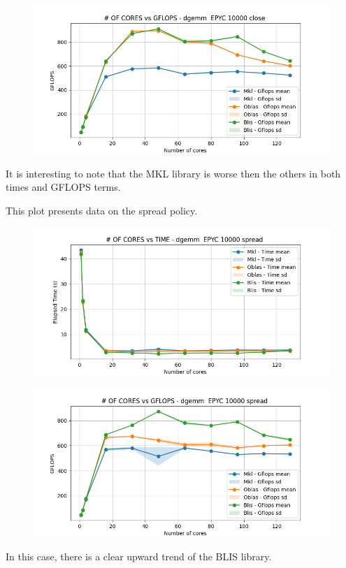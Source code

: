 \documentclass{article}
\begin{document}
\begin{figure}[H]
    \centering
    \includegraphics[width=\textwidth]{EPYC scalability/dgemm__EPYC_10000_close_gflops.png}
\end{figure}

It is interesting to note that the MKL library is worse then the others in both times and GFLOPS terms.

This plot presents data on the spread policy.
\begin{figure}[H]
    \centering
    \includegraphics[width=\textwidth]{EPYC scalability/dgemm__EPYC_10000_spread_time.png}
\end{figure}

\begin{figure}[H]
    \centering
    \includegraphics[width=\textwidth]{EPYC scalability/dgemm__EPYC_10000_spread_gflops.png}
\end{figure}
In this case, there is a clear upward trend of the BLIS library.
\end{document}
